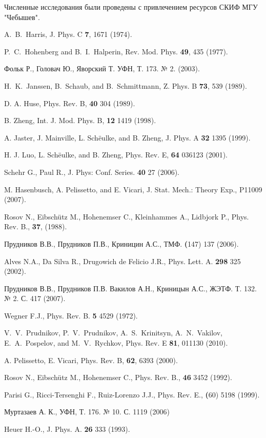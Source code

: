 \documentclass[12pt,a4paper]{article}
\begin{document}
Численные исследования были проведены с привлечением ресурсов СКИФ МГУ "Чебышев".


\begin{thebibliography}{99}

A.~B.~Harris, J. Phys. C \textbf{7}, 1671 (1974).

P.~C.~Hohenberg and B.~I.~Halperin, Rev. Mod. Phys. \textbf{49}, 435 (1977).

Фольк Р., Головач Ю., Яворский Т. УФН, Т. 173. № 2. (2003).

H.~K.~Janssen, B.~Schaub, and B.~Schmittmann, Z. Phys. B \textbf{73}, 539 (1989).

D. A. Huse, Phys. Rev. B, \textbf{40} 304 (1989).

B. Zheng, Int. J. Mod. Phys. B, \textbf{12} 1419 (1998).

A. Jaster, J. Mainville, L. Sch\"eulke, and B. Zheng, J. Phys.
A \textbf{32} 1395 (1999).

H. J. Luo, L. Sch\"eulke, and B. Zheng, Phys. Rev. E, \textbf{64} 036123 (2001).

Schehr G., Paul R., J. Phys: Conf. Series. \textbf{40} 27 (2006).

M. Hasenbusch, A. Pelissetto, and E. Vicari, J. Stat. Mech.: Theory Exp., P11009 (2007).

Rosov N., Eibsch\"utz M., Hohenemser C., Kleinhammes A., Lidbjork P., Phys. Rev. B., \textbf{37}, (1988).

Прудников В.В., Прудников П.В., Криницин А.С., ТМФ. \textbf(147) 137 (2006).

Alves N.A., Da Silva R., Drugowich de Felicio J.R., Phys. Lett. A. \textbf{298} 325 (2002).

Прудников В.В., Прудников П.В. Вакилов А.Н., Криницын А.С., ЖЭТФ. Т. 132. № 2. С. 417 (2007).

Wegner F.J., Phys. Rev. B. \textbf{5} 4529 (1972).

V.~V.~Prudnikov, P.~V.~Prudnikov, A.~S.~Krinitsyn, A.~N.~Vakilov,
E.~A.~Pospelov, and M.~V.~Rychkov, Phys. Rev. E \textbf{81}, 011130 (2010).

A. Pelissetto, E. Vicari, Phys. Rev. B, \textbf{62}, 6393 (2000).

Rosov N., Eibsch\"utz M., Hohenemser C., Phys. Rev. B., \textbf{46} 3452 (1992).

Parisi G., Ricci-Tersenghi F., Ruiz-Lorenzo J.J., Phys. Rev. E., \textbf(60) 5198 (1999).

Муртазаев А. К., УФН, Т. 176. № 10. С. 1119 (2006)

Heuer H.-O., J. Phys. A. \textbf{26} 333 (1993).

\end{thebibliography}
\end{document}
